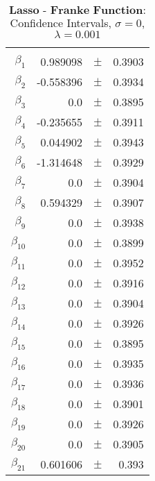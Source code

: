 \documentclass[...,numrefs]{wiley-article}
\begin{document}
\begin{table}[h]
    \centering
    \caption{$\textbf{Lasso - Franke Function:}$ Confidence Intervals, $\sigma = 0$, $\lambda = 0.001$}
    \begin{tabular}{rrrr}
    \hline
    \\
    $\beta_{1}$ & 0.989098 & $\pm$ & 0.3903 \\
    $\beta_{2}$ & -0.558396 & $\pm$ & 0.3934 \\
    $\beta_{3}$ & 0.0 & $\pm$ & 0.3895 \\
    $\beta_{4}$ & -0.235655 & $\pm$ & 0.3911 \\
    $\beta_{5}$ & 0.044902 & $\pm$ & 0.3943 \\
    $\beta_{6}$ & -1.314648 & $\pm$ & 0.3929 \\
    $\beta_{7}$ & 0.0 & $\pm$ & 0.3904 \\
    $\beta_{8}$ & 0.594329 & $\pm$ & 0.3907 \\
    $\beta_{9}$ & 0.0 & $\pm$ & 0.3938 \\
    $\beta_{10}$ & 0.0 & $\pm$ & 0.3899 \\
    $\beta_{11}$ & 0.0 & $\pm$ & 0.3952 \\
    $\beta_{12}$ & 0.0 & $\pm$ & 0.3916 \\
    $\beta_{13}$ & 0.0 & $\pm$ & 0.3904 \\
    $\beta_{14}$ & 0.0 & $\pm$ & 0.3926 \\
    $\beta_{15}$ & 0.0 & $\pm$ & 0.3895 \\
    $\beta_{16}$ & 0.0 & $\pm$ & 0.3935 \\
    $\beta_{17}$ & 0.0 & $\pm$ & 0.3936 \\
    $\beta_{18}$ & 0.0 & $\pm$ & 0.3901 \\
    $\beta_{19}$ & 0.0 & $\pm$ & 0.3926 \\
    $\beta_{20}$ & 0.0 & $\pm$ & 0.3905 \\
    $\beta_{21}$ & 0.601606 & $\pm$ & 0.393 \\
    \hline
    \end{tabular}

    \label{tab:my_label}
\end{table}
\end{document}
